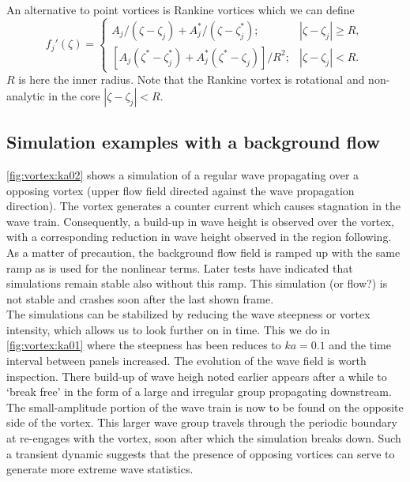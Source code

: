 \documentclass[a4paper,12pt]{article}
\renewcommand{\_}[1]{_\mr{#1}}
\begin{document}
An alternative to point vortices is Rankine vortices which we can define 
\begin{equation}
f_j'(\zeta)=
\begin{cases}
A_j/(\zeta-\zeta_j)+ A_j^*/(\zeta-\zeta_j^*); & |\zeta-\zeta_j|\geq R,\\
[A_j(\zeta^*-\zeta_j^*) + A_j^*(\zeta^*-\zeta_j)]/R^2;  & |\zeta-\zeta_j|<R.
\end{cases}
\label{eq:Rankine}
\end{equation}
$R$ is here the inner radius. Note that the Rankine vortex is rotational and non-analytic in the core $|\zeta-\zeta_j|<R$.



\subsection{Simulation examples with a background flow}
\autoref{fig:vortex:ka02} shows a simulation of a regular wave propagating over a opposing vortex (upper flow field directed against the wave propagation direction). 
The vortex generates a counter current which causes stagnation in the wave train. 
Consequently, a build-up in wave height is observed over the vortex, with a corresponding reduction in wave height observed in the region following.
As a matter of precaution, the background flow field is ramped up with the same ramp as is used for the nonlinear terms. 
Later tests have indicated that simulations remain stable also without this ramp.
This simulation (or flow?) is not stable and crashes soon after the last shown frame.
\\

The simulations can be stabilized by reducing the wave steepness or vortex intensity, which allows us to look further on in time.
This we do in \autoref{fig:vortex:ka01} where the steepness has been reduces to $ka = 0.1$ and the time interval between panels increased.
The evolution of the wave field is worth inspection.
There build-up of wave heigh noted earlier appears after a while to `break free' in the form of a large and irregular group propagating downstream. 
The small-amplitude portion of the wave train is now to be found on the opposite side of the vortex.
This larger wave group travels through the periodic boundary at re-engages with the vortex, soon after which the simulation breaks down. 
Such a transient dynamic suggests that the presence of opposing vortices can serve to generate more extreme wave statistics.  
\\
\end{document}
